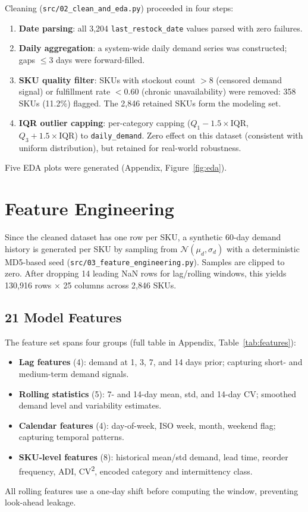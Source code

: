 \documentclass[11pt,letterpaper]{article}
\begin{document}
Cleaning (\texttt{src/02\_clean\_and\_eda.py}) proceeded in four steps:
\begin{enumerate}[nosep]
    \item \textbf{Date parsing}: all 3,204 \texttt{last\_restock\_date} values parsed with zero failures.
    \item \textbf{Daily aggregation}: a system-wide daily demand series was constructed; gaps $\leq 3$ days were forward-filled.
    \item \textbf{SKU quality filter}: SKUs with stockout count $> 8$ (censored demand signal) or fulfillment rate $< 0.60$ (chronic unavailability) were removed: 358 SKUs (11.2\%) flagged. The 2,846 retained SKUs form the modeling set.
    \item \textbf{IQR outlier capping}: per-category capping ($Q_1 - 1.5 \times \text{IQR}$, $Q_3 + 1.5 \times \text{IQR}$) to \texttt{daily\_demand}. Zero effect on this dataset (consistent with uniform distribution), but retained for real-world robustness.
\end{enumerate}
Five EDA plots were generated (Appendix, Figure~\ref{fig:eda}).


\section{Feature Engineering}
\label{sec:features}

Since the cleaned dataset has one row per SKU, a synthetic 60-day demand history is generated per SKU by sampling from $\mathcal{N}(\mu_d, \sigma_d)$ with a deterministic MD5-based seed (\texttt{src/03\_feature\_engineering.py}). Samples are clipped to zero. After dropping 14 leading NaN rows for lag/rolling windows, this yields 130,916 rows $\times$ 25 columns  across 2,846 SKUs.

\subsection{21 Model Features}

The feature set spans four groups (full table in Appendix, Table~\ref{tab:features}):
\begin{itemize}[nosep]
    \item \textbf{Lag features} (4): demand at 1, 3, 7, and 14 days prior; capturing short- and medium-term demand signals.
    \item \textbf{Rolling statistics} (5): 7- and 14-day mean, std, and 14-day CV; smoothed demand level and variability estimates.
    \item \textbf{Calendar features} (4): day-of-week, ISO week, month, weekend flag; capturing temporal patterns.
    \item \textbf{SKU-level features} (8): historical mean/std demand, lead time, reorder frequency, ADI, CV\textsuperscript{2}, encoded category and intermittency class.
\end{itemize}
All rolling features use a one-day shift before computing the window, preventing look-ahead leakage.
\end{document}
